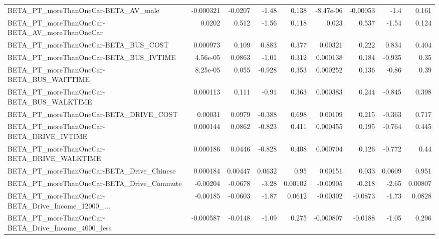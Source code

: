 \begin{tabular}{lrrrrrrrr}
BETA\_PT\_moreThanOneCar-BETA\_AV\_male                &   -0.000321 &      -0.0207 &    -1.48 &    0.138 &  -8.47e-06 &    -0.00053 &         -1.4 &         0.161 \\
BETA\_PT\_moreThanOneCar-BETA\_AV\_moreThanOneCar      &      0.0202 &        0.512 &    -1.56 &    0.118 &      0.023 &       0.537 &        -1.54 &         0.124 \\
BETA\_PT\_moreThanOneCar-BETA\_BUS\_COST               &    0.000973 &        0.109 &    0.883 &    0.377 &    0.00321 &       0.222 &        0.834 &         0.404 \\
BETA\_PT\_moreThanOneCar-BETA\_BUS\_IVTIME             &    4.56e-05 &       0.0863 &    -1.01 &    0.312 &   0.000138 &       0.184 &       -0.935 &          0.35 \\
BETA\_PT\_moreThanOneCar-BETA\_BUS\_WAITTIME           &    8.25e-05 &        0.055 &   -0.928 &    0.353 &   0.000252 &       0.136 &        -0.86 &          0.39 \\
BETA\_PT\_moreThanOneCar-BETA\_BUS\_WALKTIME           &    0.000113 &        0.111 &    -0.91 &    0.363 &   0.000383 &       0.244 &       -0.845 &         0.398 \\
BETA\_PT\_moreThanOneCar-BETA\_DRIVE\_COST             &     0.00031 &       0.0979 &   -0.388 &    0.698 &    0.00109 &       0.215 &       -0.363 &         0.717 \\
BETA\_PT\_moreThanOneCar-BETA\_DRIVE\_IVTIME           &    0.000144 &       0.0862 &   -0.823 &    0.411 &   0.000455 &       0.195 &       -0.764 &         0.445 \\
BETA\_PT\_moreThanOneCar-BETA\_DRIVE\_WALKTIME         &    0.000186 &       0.0446 &   -0.828 &    0.408 &   0.000704 &       0.126 &       -0.772 &          0.44 \\
BETA\_PT\_moreThanOneCar-BETA\_Drive\_Chinese          &    0.000184 &      0.00447 &   0.0632 &     0.95 &    0.00151 &       0.033 &       0.0609 &         0.951 \\
BETA\_PT\_moreThanOneCar-BETA\_Drive\_Commute          &    -0.00204 &      -0.0678 &    -3.28 &  0.00102 &   -0.00905 &      -0.218 &        -2.65 &       0.00807 \\
BETA\_PT\_moreThanOneCar-BETA\_Drive\_Income\_12000\_... &    -0.00185 &      -0.0603 &    -1.87 &   0.0612 &   -0.00302 &     -0.0873 &        -1.73 &        0.0828 \\
BETA\_PT\_moreThanOneCar-BETA\_Drive\_Income\_4000\_less &   -0.000587 &      -0.0148 &    -1.09 &    0.275 &  -0.000807 &     -0.0188 &        -1.05 &         0.296 \\

\end{tabular}
